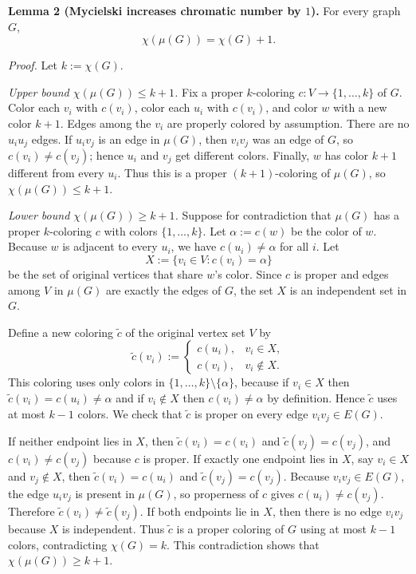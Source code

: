 \medskip
\noindent\textbf{Lemma 2 (Mycielski increases chromatic number by $1$).}
For every graph $G$,
\[\chi(\mu(G))=\chi(G)+1.
\]

\noindent\emph{Proof.}
Let $k:=\chi(G)$.

\emph{Upper bound $\chi(\mu(G))\le k+1$.}
Fix a proper $k$-coloring $c:V\to\{1,\dots,k\}$ of $G$.
Color each $v_i$ with $c(v_i)$, color each $u_i$ with $c(v_i)$, and color $w$ with a new color $k+1$.
Edges among the $v_i$ are properly colored by assumption.
There are no $u_i u_j$ edges.
If $u_i v_j$ is an edge in $\mu(G)$, then $v_i v_j$ was an edge of $G$, so $c(v_i)\ne c(v_j)$; hence $u_i$ and $v_j$ get different colors.
Finally, $w$ has color $k+1$ different from every $u_i$.
Thus this is a proper $(k+1)$-coloring of $\mu(G)$, so $\chi(\mu(G))\le k+1$.

\emph{Lower bound $\chi(\mu(G))\ge k+1$.}
Suppose for contradiction that $\mu(G)$ has a proper $k$-coloring $c$ with colors $\{1,\dots,k\}$.
Let $\alpha:=c(w)$ be the color of $w$.
Because $w$ is adjacent to every $u_i$, we have $c(u_i)\ne \alpha$ for all $i$.
Let
\[X:=\{v_i\in V: c(v_i)=\alpha\}
\]
be the set of original vertices that share $w$'s color.
Since $c$ is proper and edges among $V$ in $\mu(G)$ are exactly the edges of $G$, the set $X$ is an independent set in $G$.

Define a new coloring $\tilde c$ of the original vertex set $V$ by
\[\tilde c(v_i):=\begin{cases}
 c(u_i), & v_i\in X,\\
 c(v_i), & v_i\notin X.
\end{cases}
\]
This coloring uses only colors in $\{1,\dots,k\}\setminus\{\alpha\}$, because if $v_i\in X$ then $\tilde c(v_i)=c(u_i)\ne\alpha$ and if $v_i\notin X$ then $c(v_i)\ne\alpha$ by definition.
Hence $\tilde c$ uses at most $k-1$ colors.
We check that $\tilde c$ is proper on every edge $v_iv_j\in E(G)$.

If neither endpoint lies in $X$, then $\tilde c(v_i)=c(v_i)$ and $\tilde c(v_j)=c(v_j)$, and $c(v_i)\ne c(v_j)$ because $c$ is proper.
If exactly one endpoint lies in $X$, say $v_i\in X$ and $v_j\notin X$, then $\tilde c(v_i)=c(u_i)$ and $\tilde c(v_j)=c(v_j)$.
Because $v_iv_j\in E(G)$, the edge $u_i v_j$ is present in $\mu(G)$, so properness of $c$ gives $c(u_i)\ne c(v_j)$.
Therefore $\tilde c(v_i)\ne \tilde c(v_j)$.
If both endpoints lie in $X$, then there is no edge $v_iv_j$ because $X$ is independent.
Thus $\tilde c$ is a proper coloring of $G$ using at most $k-1$ colors, contradicting $\chi(G)=k$.
This contradiction shows that $\chi(\mu(G))\ge k+1$.

